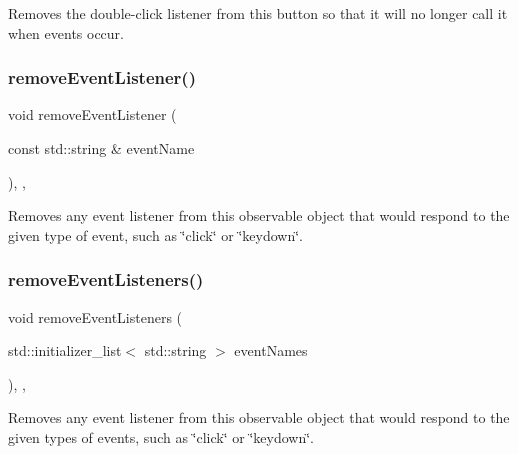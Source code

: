 Removes the double-\/click listener from this button so that it will no longer call it when events occur. 

\mbox{\label{classGObservable_acbcf1ed3a851ad8a3c17ef38d86b481d}} 
\subsubsection{\texorpdfstring{remove\+Event\+Listener()}{removeEventListener()}}
{\footnotesize\ttfamily void remove\+Event\+Listener (\begin{DoxyParamCaption}\item[{const std\+::string \&}]{event\+Name }\end{DoxyParamCaption})\hspace{0.3cm}{\ttfamily [protected]}, {\ttfamily [virtual]}, {\ttfamily [inherited]}}



Removes any event listener from this observable object that would respond to the given type of event, such as \char`\"{}click\char`\"{} or \char`\"{}keydown\char`\"{}. 

\mbox{\label{classGObservable_af51cc35c29a1bd1908609d432decdbb6}} 
\subsubsection{\texorpdfstring{remove\+Event\+Listeners()}{removeEventListeners()}}
{\footnotesize\ttfamily void remove\+Event\+Listeners (\begin{DoxyParamCaption}\item[{std\+::initializer\+\_\+list$<$ std\+::string $>$}]{event\+Names }\end{DoxyParamCaption})\hspace{0.3cm}{\ttfamily [protected]}, {\ttfamily [virtual]}, {\ttfamily [inherited]}}



Removes any event listener from this observable object that would respond to the given types of events, such as \char`\"{}click\char`\"{} or \char`\"{}keydown\char`\"{}. 

